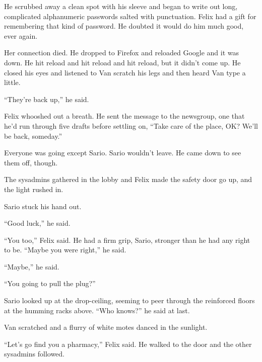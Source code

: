 He scrubbed away a clean spot with his sleeve and began to write
out long, complicated alphanumeric passwords salted with
punctuation. Felix had a gift for remembering that kind of
password. He doubted it would do him much good, ever again.

\tb

Her connection died. He dropped to Firefox and reloaded Google and
it was down. He hit reload and hit reload and hit reload, but it
didn’t come up. He closed his eyes and listened to Van scratch his
legs and then heard Van type a little.

“They’re back up,” he said.

Felix whooshed out a breath. He sent the message to the newsgroup,
one that he’d run through five drafts before settling on, “Take
care of the place, OK? We’ll be back, someday.”

Everyone was going except Sario. Sario wouldn’t leave. He came down
to see them off, though.

The sysadmins gathered in the lobby and Felix made the safety door
go up, and the light rushed in.

Sario stuck his hand out.

“Good luck,” he said.

“You too,” Felix said. He had a firm grip, Sario, stronger than he
had any right to be. “Maybe you were right,” he said.

“Maybe,” he said.

“You going to pull the plug?”

Sario looked up at the drop-ceiling, seeming to peer through the
reinforced floors at the humming racks above. “Who knows?” he said
at last.

Van scratched and a flurry of white motes danced in the sunlight.

“Let’s go find you a pharmacy,” Felix said. He walked to the door
and the other sysadmins followed.

